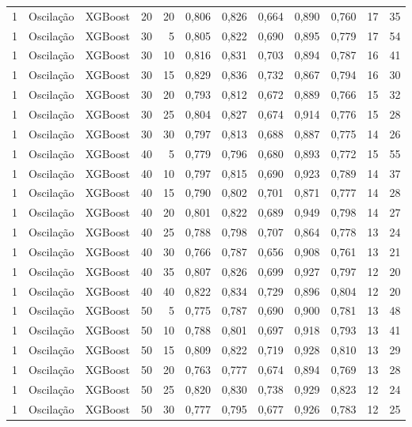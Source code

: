\begin{longtable}{@{}rllrrrrrrrrr@{}}
1 & Oscilação & XGBoost & 20 & 20 & 0,806 & 0,826 & 0,664 & 0,890 & 0,760 & 17 & 35 \\
1 & Oscilação & XGBoost & 30 & 5 & 0,805 & 0,822 & 0,690 & 0,895 & 0,779 & 17 & 54 \\
1 & Oscilação & XGBoost & 30 & 10 & 0,816 & 0,831 & 0,703 & 0,894 & 0,787 & 16 & 41 \\
1 & Oscilação & XGBoost & 30 & 15 & 0,829 & 0,836 & 0,732 & 0,867 & 0,794 & 16 & 30 \\
1 & Oscilação & XGBoost & 30 & 20 & 0,793 & 0,812 & 0,672 & 0,889 & 0,766 & 15 & 32 \\
1 & Oscilação & XGBoost & 30 & 25 & 0,804 & 0,827 & 0,674 & 0,914 & 0,776 & 15 & 28 \\
1 & Oscilação & XGBoost & 30 & 30 & 0,797 & 0,813 & 0,688 & 0,887 & 0,775 & 14 & 26 \\
1 & Oscilação & XGBoost & 40 & 5 & 0,779 & 0,796 & 0,680 & 0,893 & 0,772 & 15 & 55 \\
1 & Oscilação & XGBoost & 40 & 10 & 0,797 & 0,815 & 0,690 & 0,923 & 0,789 & 14 & 37 \\
1 & Oscilação & XGBoost & 40 & 15 & 0,790 & 0,802 & 0,701 & 0,871 & 0,777 & 14 & 28 \\
1 & Oscilação & XGBoost & 40 & 20 & 0,801 & 0,822 & 0,689 & 0,949 & 0,798 & 14 & 27 \\
1 & Oscilação & XGBoost & 40 & 25 & 0,788 & 0,798 & 0,707 & 0,864 & 0,778 & 13 & 24 \\
1 & Oscilação & XGBoost & 40 & 30 & 0,766 & 0,787 & 0,656 & 0,908 & 0,761 & 13 & 21 \\
1 & Oscilação & XGBoost & 40 & 35 & 0,807 & 0,826 & 0,699 & 0,927 & 0,797 & 12 & 20 \\
1 & Oscilação & XGBoost & 40 & 40 & 0,822 & 0,834 & 0,729 & 0,896 & 0,804 & 12 & 20 \\
1 & Oscilação & XGBoost & 50 & 5 & 0,775 & 0,787 & 0,690 & 0,900 & 0,781 & 13 & 48 \\
1 & Oscilação & XGBoost & 50 & 10 & 0,788 & 0,801 & 0,697 & 0,918 & 0,793 & 13 & 41 \\
1 & Oscilação & XGBoost & 50 & 15 & 0,809 & 0,822 & 0,719 & 0,928 & 0,810 & 13 & 29 \\
1 & Oscilação & XGBoost & 50 & 20 & 0,763 & 0,777 & 0,674 & 0,894 & 0,769 & 13 & 28 \\
1 & Oscilação & XGBoost & 50 & 25 & 0,820 & 0,830 & 0,738 & 0,929 & 0,823 & 12 & 24 \\
1 & Oscilação & XGBoost & 50 & 30 & 0,777 & 0,795 & 0,677 & 0,926 & 0,783 & 12 & 25 \\

\end{longtable}
